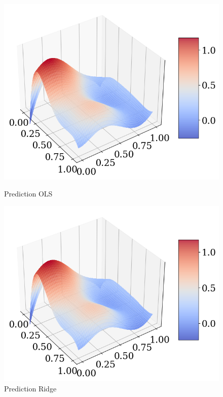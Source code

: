 \documentclass[twoside,11pt]{report}
\begin{document}
\begin{figure}[h]
\begin{minipage}[t]{.48\linewidth}
    \begin{center}
        \includegraphics[width=1.0\textwidth]{../runsAndAdditions/predictionOLS.png}
        \caption{Prediction OLS}\label{fig:predictionOLS}
\end{center}
\end{minipage}
\hspace{4mm}
\begin{minipage}[t]{.48\linewidth}
    \begin{center}
        \includegraphics[width=1.0\textwidth]{../runsAndAdditions/predictionRidge.png}
        \caption{Prediction Ridge}\label{fig:predictionRidge}
    \end{center}
\end{minipage}
\end{figure}
\end{document}
